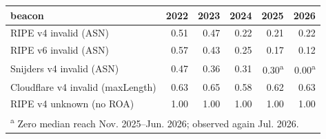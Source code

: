\begin{tabular}{lrrrrr}
\toprule
beacon & 2022 & 2023 & 2024 & 2025 & 2026 \\
\midrule
RIPE v4 invalid (ASN) & 0.51 & 0.47 & 0.22 & 0.21 & 0.22 \\
RIPE v6 invalid (ASN) & 0.57 & 0.43 & 0.25 & 0.17 & 0.12 \\
Snijders v4 invalid (ASN) & 0.47 & 0.36 & 0.31 & 0.30\textsuperscript{a} & 0.00\textsuperscript{a} \\
Cloudflare v4 invalid (maxLength) & 0.63 & 0.65 & 0.58 & 0.62 & 0.63 \\
RIPE v4 unknown (no ROA) & 1.00 & 1.00 & 1.00 & 1.00 & 1.00 \\
\bottomrule
\multicolumn{6}{p{0.95\columnwidth}}{\footnotesize \textsuperscript{a} Zero median reach Nov. 2025--Jun. 2026; observed again Jul. 2026.} \\
\end{tabular}
